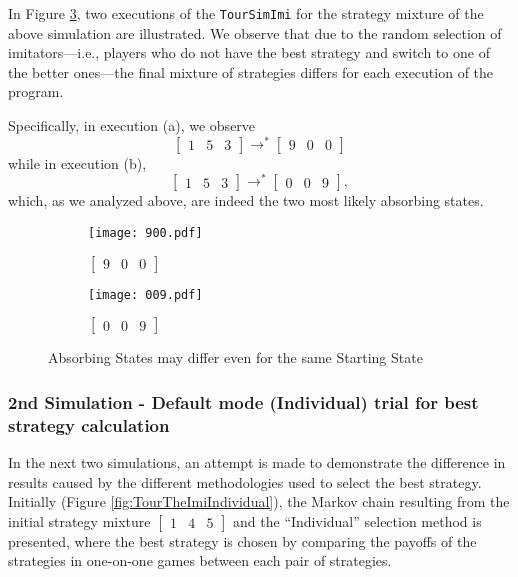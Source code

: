 In Figure \ref{fig:TourSimImi153}, two executions of the \texttt{TourSimImi} for the strategy mixture of the above simulation are illustrated. We observe that due to the random selection of imitators—i.e., players who do not have the best strategy and switch to one of the better ones—the final mixture of strategies differs for each execution of the program. 

Specifically, in execution (a), we observe 
\[
\begin{bmatrix}1 & 5 & 3\end{bmatrix} \rightarrow^* \begin{bmatrix}9 & 0 & 0\end{bmatrix}
\]
while in execution (b),
\[
\begin{bmatrix}1 & 5 & 3\end{bmatrix} \rightarrow^* \begin{bmatrix}0 & 0 & 9\end{bmatrix},
\]
which, as we analyzed above, are indeed the two most likely absorbing states.

	\begin{figure}[h]
		\centering
		\begin{subfigure}{.5\textwidth}
			\centering
	      	\texttt{[image: 900.pdf]}
			\caption{$\begin{bmatrix}9&0&0\end{bmatrix}$}
	      	\label{fig:900}
		\end{subfigure}%
		\begin{subfigure}{.5\textwidth}
			\centering
	      	\texttt{[image: 009.pdf]}
			\caption{$\begin{bmatrix}0&0&9\end{bmatrix}$}
	      	\label{fig:009}
		\end{subfigure}
		\caption{Absorbing States may differ even for the same Starting State}
		\label{fig:TourSimImi153}
	\end{figure}

\subsubsection{2nd Simulation - Default mode (Individual) trial for best strategy calculation}
In the next two simulations, an attempt is made to demonstrate the difference in results caused by the different methodologies used to select the best strategy. Initially (Figure \ref{fig:TourTheImiIndividual}), the Markov chain resulting from the initial strategy mixture $\begin{bmatrix}1 & 4 & 5\end{bmatrix}$ and the ``Individual'' selection method is presented, where the best strategy is chosen by comparing the payoffs of the strategies in one-on-one games between each pair of strategies.

